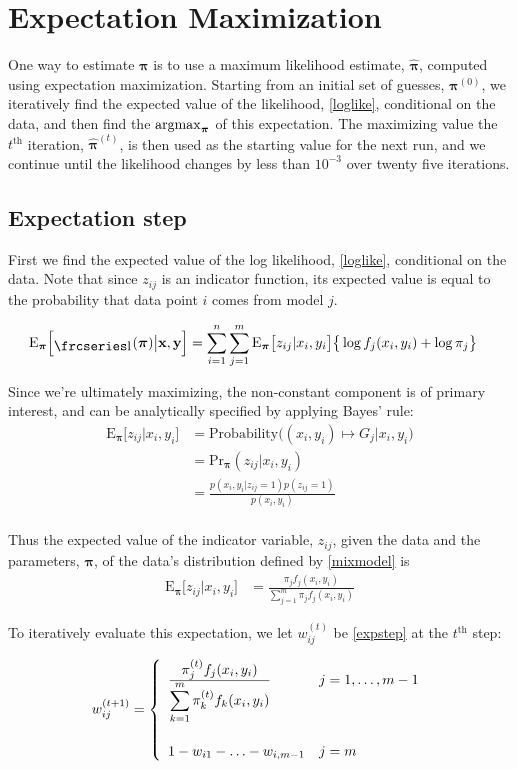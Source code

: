 \documentclass[12pt]{amsart}
\newcommand{\textfrc}[1]{{\frcseries#1}}
\newcommand{\mathfrc}[1]{\raisebox{-0.8mm}{\text{\textfrc{\small #1}}}\hspace{0.4mm}}
\newcommand{\vect}[1]{\boldsymbol{\mathbf{#1}}}
\newcommand{\eqn}[1]{\begin{align*}
#1
\end{align*}}
\newcommand{\eqnl}[2]{\begin{align} \label{#1}
#2
\end{align}}
\newcommand{\bl}{\big\{}
\newcommand{\br}{\big\}}
\newcommand{\argmax}{\operatornamewithlimits{argmax}}
\newcommand{\eqnset}[4]{
\[ #1 = #2 \left\{ \begin{array}{#3}
        #4
\end{array} \right. \] 
}
\newcommand{\vx}{\vect{x}}
\newcommand{\vy}{\vect{y}}
\newcommand{\vp}{\vect{\pi}}
\newcommand{\vph}{\hat{\vect{\pi}}}
\newcommand{\fab}{f_j}
\newcommand{\llp}{\mathfrc{l}(\vect{\pi})}
\newcommand{\sumn}{\sum^n_{i=1}}
\newcommand{\summ}{\sum^m_{j=1}}
\newcommand{\sumk}{\sum^m_{k=1}}
\begin{document}
\section{Expectation Maximization}

One way to estimate $\vp$ is to use a maximum likelihood estimate, $\vph$, computed using expectation maximization. Starting from an initial set of guesses, $\vp^{(0)}$, we iteratively find the expected value of the likelihood, \eqref{loglike}, conditional on the data, and then find the $\argmax_{\vp}$ of this expectation. The maximizing value the $t^\text{th}$ iteration, $\vph^{(t)}$, is then used as the starting value for the next run, and we continue until the likelihood changes by less than $10^{-3}$ over twenty five iterations.

\subsection{Expectation step}
First we find the expected value of the log likelihood, \eqref{loglike}, conditional on the data. Note that since $z_{ij}$ is an indicator function, its expected value is equal to the probability that data point $i$ comes from model $j$.

\eqnl{estep}{
	\text{E}_{\vp}\Big[\llp \big| \vx,\vy \Big] &= \sumn \summ \text{E}_{\vp}\big[z_{ij}|x_i,y_i\big] \bl \log \fab(x_i,y_i) + \log \pi_j  \br
}

Since we're ultimately maximizing, the non-constant component is of primary interest, and can be analytically specified by applying Bayes' rule:
\eqn{
	\text{E}_{\vp}\Big[  z_{ij} | x_i, y_i \Big] &= \text{Probability}\Big((x_i,y_i) \mapsto G_j \big | x_i,y_i\Big)	\\
	&= \text{Pr}_{\vp}(z_{ij}|x_i,y_i)	\\
	&= \frac{p(x_i,y_i|z_{ij}=1)p(z_{ij}=1)}{p(x_i,y_i)}	\\
}

Thus the expected value of the indicator variable, $z_{ij}$, given the data and the parameters, $\vp$, of the data's distribution defined by \eqref{mixmodel} is
\eqnl{expstep}{
	\text{E}_{\vp}\Big[  z_{ij} | x_i, y_i \Big] &=  \frac{\pi_j \fab(x_i,y_i)  }{\summ \pi_j \fab(x_i,y_i)}
}

To iteratively evaluate this expectation, we let $w^{(t)}_{ij}$ be \eqref{expstep} at the $t^\text{th}$ step:
\eqnset{w^{(t+1)}_{ij}}{}{ll}{
	\frac{\displaystyle\pi^{(t)}_{j} \fab(x_i,y_i)}{\displaystyle\sumk \pi^{(t)}_{k}f_k(x_i,y_i)}				& j=1,\ldots,m-1	\\
	\vspace{1mm} & \\
	1 - w_{i1} - \ldots - w_{i,m-1}		& j=m
}
\end{document}
